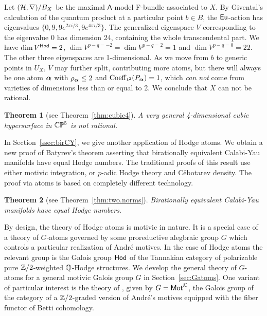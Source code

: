 \documentclass[twoside,leqno]{article}
\numberwithin{equation}{section}
\theoremstyle{plain}
\newtheorem*{theorem*}{Theorem}
\theoremstyle{definition}
\begin{document}
Let $(\mathcal H,\nabla)/B_{X}$ be the maximal $\mathsf{A}$-model F-bundle associated to $X$.
By Givental's calculation \cite{Givental_Homological_geometry_and_mirror_symmetry} of the quantum product at a particular point $b\in B$, the $\operatorname{\mathsf{Eu}}$-action has eigenvalues $\{0, 9, 9 e^{2\pi i/3}, 9 e^{4\pi i/3}\}$.
The generalized eigenspace $V$ corresponding to the eigenvalue 0 has dimension 24, containing the whole transcendental part.
We have $\dim V^{\mathsf{Hod}} = 2$, $\dim V^{p-q=-2}=\dim V^{p-q=2}=1$ and $\dim V^{p-q=0}=22$.
The other three eigenspaces are 1-dimensional.
As we move from $b$ to generic points in $U_X$, $V$ may further split, contributing more atoms,  but there will always be one atom $\boldsymbol{\alpha}$ with $\rho_{\boldsymbol{\alpha}} \le 2$ and $\operatorname{Coeff}_{t^2}(P_{\boldsymbol{\alpha}}) = 1$, which \emph{can not} come from varieties of dimensions less than or equal to 2.
We conclude that $X$ can not be rational. 

\begin{theorem*}[see Theorem~\ref{thm:cubic4}]
A very general 4-dimensional cubic hypersurface in $\mathbb C\mathbb P^5$ is not rational.
\end{theorem*}

In Section~\ref{ssec:birCY}, we give another application of Hodge atoms.
We obtain a new proof of Batyrev's theorem \cite[Corollary~6.29]{Batyrev-StringyHodge} asserting that birationally equivalent Calabi-Yau manifolds have equal Hodge numbers.
The traditional proofs of this result \cite{Batyrev-StringyHodge,Wang-Kequivalence,Ito} use either motivic integration, or $p$-adic Hodge theory and C\v{e}botarev density. The proof via atoms is based on completely different technology.

\begin{theorem*}[see Theorem~\ref{thm:two.norms}]
Birationally equivalent Calabi-Yau manifolds have equal Hodge numbers.   
\end{theorem*}

By design, the theory of Hodge atoms is motivic in nature. It is a special case of a theory of $G$-atoms governed by some proreductive alegbraic group $G$ which controls a particular realization of Andr\'{e} motives.  In the case of Hodge atoms the relevant group is the  Galois group $\mathsf{Hod}$ of the Tannakian category of polarizable pure $\mathbb Z/2$-weighted $\mathbb Q$-Hodge structures. 
We develop the general theory of $G$-atoms for a general motivic Galois group $G$ in Section~\ref{sec:Gatoms}.
One variant of particular interest is the theory of , given by $G=\mathsf{Mot}^{\mathcal K}$, the Galois group of the category of a $\mathbb Z/2$-graded version of André's motives \cite{Andre_Pour_une_theorie_inconditionnelle_des_motifs} equipped with the fiber functor of Betti cohomology.
\end{document}
